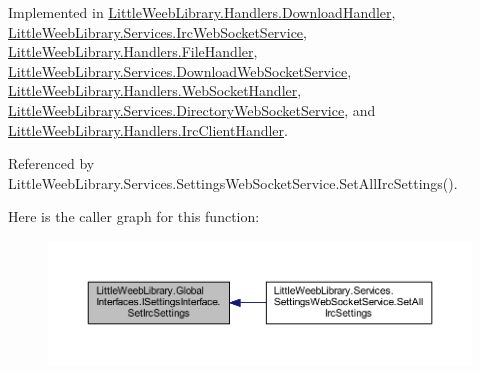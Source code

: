 Implemented in \mbox{\hyperlink{class_little_weeb_library_1_1_handlers_1_1_download_handler_a6edcb9be7543c9fb587df06c994f50fb}{Little\+Weeb\+Library.\+Handlers.\+Download\+Handler}}, \mbox{\hyperlink{class_little_weeb_library_1_1_services_1_1_irc_web_socket_service_a6476ee44ddf292f916b20085c03af5eb}{Little\+Weeb\+Library.\+Services.\+Irc\+Web\+Socket\+Service}}, \mbox{\hyperlink{class_little_weeb_library_1_1_handlers_1_1_file_handler_a4ccfd9a9698ca0dc9e228aabe27ac756}{Little\+Weeb\+Library.\+Handlers.\+File\+Handler}}, \mbox{\hyperlink{class_little_weeb_library_1_1_services_1_1_download_web_socket_service_ac692e2804ac253cc2ceac79d88a2e191}{Little\+Weeb\+Library.\+Services.\+Download\+Web\+Socket\+Service}}, \mbox{\hyperlink{class_little_weeb_library_1_1_handlers_1_1_web_socket_handler_a9c13ff9ec9ed3dfc07235f47332276d1}{Little\+Weeb\+Library.\+Handlers.\+Web\+Socket\+Handler}}, \mbox{\hyperlink{class_little_weeb_library_1_1_services_1_1_directory_web_socket_service_a223c62acb36e1ac602552fa1ecf67057}{Little\+Weeb\+Library.\+Services.\+Directory\+Web\+Socket\+Service}}, and \mbox{\hyperlink{class_little_weeb_library_1_1_handlers_1_1_irc_client_handler_a510c909225e51c66b65f7114ebd356d3}{Little\+Weeb\+Library.\+Handlers.\+Irc\+Client\+Handler}}.



Referenced by Little\+Weeb\+Library.\+Services.\+Settings\+Web\+Socket\+Service.\+Set\+All\+Irc\+Settings().

Here is the caller graph for this function\+:\nopagebreak
\begin{figure}[H]
\begin{center}
\leavevmode
\includegraphics[width=350pt]{interface_little_weeb_library_1_1_global_interfaces_1_1_i_settings_interface_a9ddf06e247a96d757482b37ddb070e3d_icgraph}
\end{center}
\end{figure}
\mbox{\label{interface_little_weeb_library_1_1_global_interfaces_1_1_i_settings_interface_a5c53e44105f1f4c7f8c3e546d29939d7}} 
